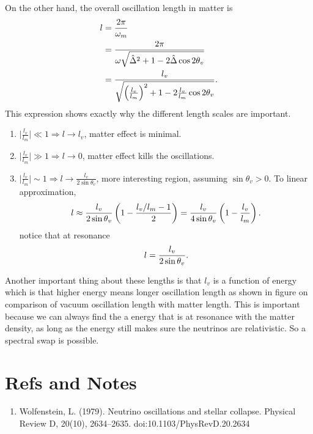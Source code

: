 \documentclass[letterpaper,12pt,english]{sphinxmanual}
\begin{document}
On the other hand, the overall oscillation length in matter is
\begin{gather}
\begin{split}l &= \frac{2\pi}{\omega_m} \\
& = \frac{2\pi}{\omega \sqrt{ \hat\Delta^2 + 1 - 2 \hat\Delta \cos 2\theta_v }} \\
& = \frac{l_v}{ \sqrt{\left(\frac{l_v}{l_m} \right)^2 +1 - 2\frac{l_v}{l_m}\cos 2\theta_v  }} .\end{split}\notag
\end{gather}
This expression shows exactly why the different length scales are important.
\begin{enumerate}
\item {} 
\(\lvert \frac{l_v}{l_m} \rvert \ll 1 \Rightarrow l\to l_v\), matter effect is minimal.

\item {} 
\(\lvert \frac{l_v}{l_m} \rvert \gg 1 \Rightarrow l\to 0\), matter effect kills the oscillations.

\item {} 
\(\lvert \frac{l_v}{l_m}\rvert \sim 1 \Rightarrow l\to \frac{l_v}{2\sin\theta_v}\), more interesting region, assuming \(\sin\theta_v>0\). To linear approximation,
\begin{gather}
\begin{split}l \approx \frac{l_v}{2\sin\theta_v} \left( 1 -  \frac{l_v/l_m - 1}{2} \right) = \frac{l_v}{4\sin\theta_v} \left( 1 -  \frac{l_v}{l_m } \right) .\end{split}\notag
\end{gather}
notice that at resonance
\begin{gather}
\begin{split}l = \frac{l_v}{2\sin \theta_v}.\end{split}\notag
\end{gather}
\end{enumerate}

Another important thing about these lengths is that \(l_v\) is a function of energy which is that higher energy means longer oscillation length as shown in figure on comparison of vacuum oscillation length with matter length. This is important because we can always find the a energy that is at resonance with the matter density, as long as the energy still makes sure the neutrinos are relativistic. So a spectral swap is possible.


\section{Refs and Notes}
\label{qualitative:refs-and-notes}\begin{enumerate}
\item {} 
Wolfenstein, L. (1979). Neutrino oscillations and stellar collapse. Physical Review D, 20(10), 2634–2635. doi:10.1103/PhysRevD.20.2634

\end{enumerate}
\end{document}
